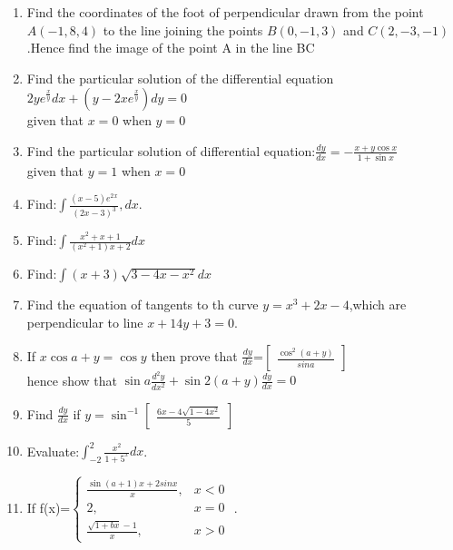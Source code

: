 \documentclass[12pt,-letter paper]{article}
\providecommand{\myvec}[1]{\ensuremath{\begin{bmatrix}#1\end{bmatrix}}}
\providecommand{\brak}[1]{\ensuremath{\left(#1\right)}}
\begin{document}
\begin{enumerate}
\item Find the coordinates of the foot of perpendicular drawn from the point $A\brak{-1,8,4}$ to the line joining the points $B\brak{0,-1,3}$ and $C\brak{2,-3,-1}$.Hence find the image of the point A in the line BC

\item Find the particular solution of the differential equation $2ye^\frac{x}{y}dx+\brak{{y-2xe^\frac{x}{y}}}dy=0$\\
	given that $x=0$  when $y=0$




\item Find the particular solution of differential equation:$\frac{dy}{dx}=-\frac{x+y\cos x}{1+\sin x}$\\ given that $y=1$ when $x=0$ 


\item Find:$\int\frac{\brak{x-5}e^2{}^x}{\brak{2x-3}^3},dx$.


\item Find:$\int\frac{x^2+x+1}{\brak{x^2+1}{x+2}}dx$






\item Find:$\int{\brak{x+3}}\sqrt{3-4x-x^2}dx$

  \item Find the equation of tangents to th curve $y=x^3+2x-4$,which are perpendicular to line $x+14y+3=0$.
		  
  \item If $x\cos{a+y}=\cos{y}$ then prove that $\frac{dy}{dx}$=$\myvec{\frac{\cos^2 \brak{a+y}}{sina}}$\\
	  hence show that $\sin a\frac{d^{2}y}{dx^2}+\sin2\brak{a+y}\frac{dy}{dx}=0$

   
  \item Find $\frac{dy}{dx}$ if $y=\sin^{-1}\myvec{\frac{6x-4\sqrt{1-4x^2}}{5}}$



  \item Evaluate:$\int_{-2}^{2}\frac{x^2}{1+5^x}dx$.

  \item If f(x)=$\begin{cases}
		  \frac{\sin(a+1)x+2 sinx}{x},&x<0\\
		  2,  &x=0\\
		  \frac{\sqrt{1+bx}-1}{x},&x>0
  \end{cases}$ .





\end{enumerate}
\end{document}
